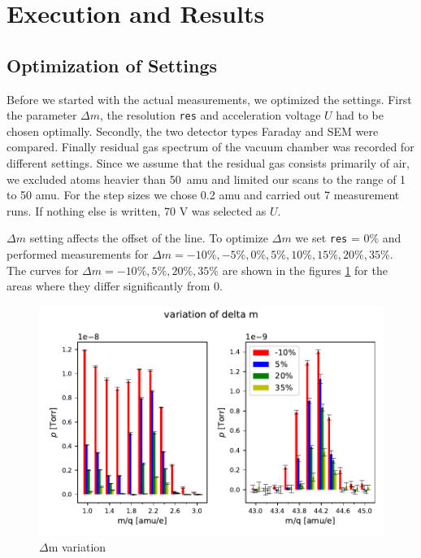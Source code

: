 \newpage
\section{Execution and Results} \label{sec:results}
    \subsection{Optimization of Settings}
    Before we started with the actual measurements, we optimized the settings.
    First the parameter $\Delta m$, the resolution \texttt{res} and acceleration voltage $U$ had to be chosen optimally. Secondly, the two detector types Faraday and SEM were compared. Finally residual gas spectrum of the vacuum chamber was recorded for different settings. Since we assume that the residual gas consists primarily of air, we excluded atoms heavier than 50~amu and limited our scans to the range of 1 to 50 amu. For the step sizes we chose 0.2 amu and carried out 7 measurement runs. If nothing else is written, 70 V was selected as $U$.
    
    $\Delta m$ setting affects the offset of the line. To optimize $\Delta m$ we set \texttt{res} = 0\% and performed measurements for $\Delta m = -10\%, -5\%, 0\%, 5\%, 10\%, 15\%, 20\%, 35\%$.  The curves for $\Delta m = -10\%, 5\%, 20\%, 35\%$ are shown in the figures \ref{fig:delta_m_variation} for the areas where they differ significantly from 0.
    
    \begin{figure}[h!]
        \centering
        \includegraphics[width=1 \textwidth]{Report/DataResultsPlots/delta m_variation_h2_and_co2.pdf}
        \caption{$\Delta$m variation}
        \label{fig:delta_m_variation}
    \end{figure}
    
